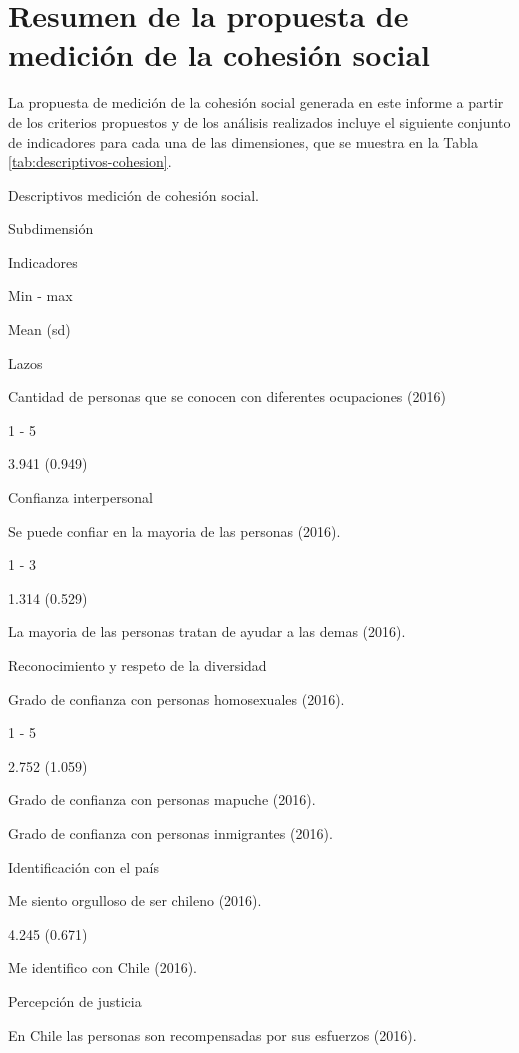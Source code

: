 \documentclass[
  12pt,
]{book}
\begin{document}
\hypertarget{resumen-de-la-propuesta-de-mediciuxf3n-de-la-cohesiuxf3n-social}{%
\section{Resumen de la propuesta de medición de la cohesión social}\label{resumen-de-la-propuesta-de-mediciuxf3n-de-la-cohesiuxf3n-social}}

La propuesta de medición de la cohesión social generada en este informe a partir de los criterios propuestos y de los análisis realizados incluye el siguiente conjunto de indicadores para cada una de las dimensiones, que se muestra en la Tabla \ref{tab:descriptivos-cohesion}.

\label{tab:descriptivos-cohesion}Descriptivos medición de cohesión social.

Subdimensión

Indicadores

Min - max

Mean (sd)

Lazos

Cantidad de personas que se conocen con diferentes ocupaciones (2016)

1 - 5

3.941 (0.949)

Confianza interpersonal

Se puede confiar en la mayoria de las personas (2016).

1 - 3

1.314 (0.529)

La mayoria de las personas tratan de ayudar a las demas (2016).

Reconocimiento y respeto de la diversidad

Grado de confianza con personas homosexuales (2016).

1 - 5

2.752 (1.059)

Grado de confianza con personas mapuche (2016).

Grado de confianza con personas inmigrantes (2016).

Identificación con el país

Me siento orgulloso de ser chileno (2016).

4.245 (0.671)

Me identifico con Chile (2016).

Percepción de justicia

En Chile las personas son recompensadas por sus esfuerzos (2016).
\end{document}
